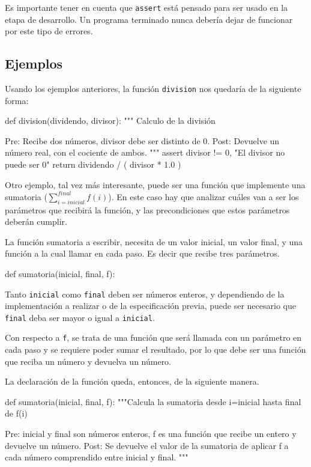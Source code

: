 \begin{atencion}
Es importante tener en cuenta que \lstinline!assert! está pensado para ser
usado en la etapa de desarrollo. Un programa terminado nunca debería dejar
de funcionar por este tipo de errores.
\end{atencion}

\subsection{Ejemplos}

Usando los ejemplos anteriores, la función \lstinline!division! nos
quedaría de la siguiente forma:

\begin{codigo-python-sn}
def division(dividendo, divisor):
    """ Calculo de la división

    Pre: Recibe dos números, divisor debe ser distinto de 0.
    Post: Devuelve un número real, con el cociente de ambos.
    """
    assert divisor != 0, "El divisor no puede ser 0"
    return dividendo  / ( divisor * 1.0 )
\end{codigo-python-sn}

Otro ejemplo, tal vez más interesante, puede ser una función que implemente
una sumatoria ($\sum_{i=inicial}^{final} f(i)$).  En este caso hay que
analizar cuáles van a ser los parámetros que recibirá la función, y las
precondiciones que estos parámetros deberán cumplir.

La función sumatoria a escribir, necesita de un valor inicial, un valor
final, y una función a la cual llamar en cada paso. Es decir que recibe
tres parámetros.

\begin{codigo-python-sn}
def sumatoria(inicial, final, f):
\end{codigo-python-sn}

Tanto \lstinline!inicial! como \lstinline!final! deben ser números enteros,
y dependiendo de la implementación a realizar o de la especificación
previa, puede ser necesario que \lstinline!final! deba ser mayor o igual a
\lstinline!inicial!.

Con respecto a \lstinline!f!, se trata de una función que será llamada con
un parámetro en cada paso y se requiere poder sumar el resultado, por lo
que debe ser una función que reciba un número y devuelva un número.

La declaración de la función queda, entonces, de la siguiente manera.

\begin{codigo-python-sn}
def sumatoria(inicial, final, f):
    """Calcula la sumatoria desde i=inicial hasta final de f(i)

    Pre: inicial y final son números enteros, f es una función que
         recibe un entero y devuelve un número.
    Post: Se devuelve el valor de la sumatoria de aplicar f a cada
          número comprendido entre inicial y final.
	"""
\end{codigo-python-sn}

